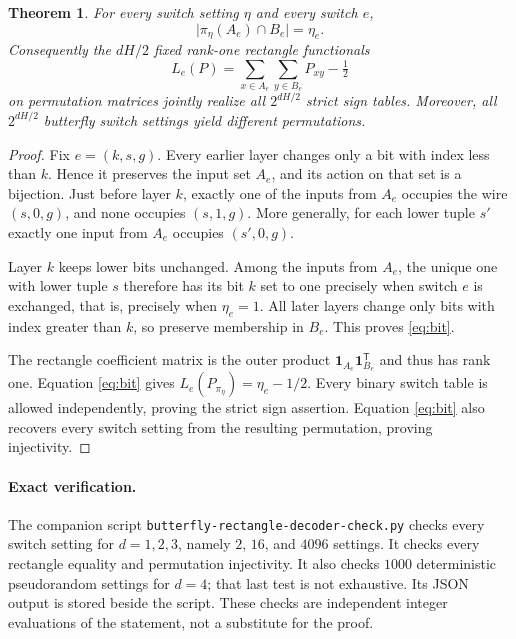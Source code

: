 \documentclass[11pt]{article}
\newtheorem{theorem}{Theorem}
\begin{document}
\begin{theorem}\label{thm:decoder}
For every switch setting $\eta$ and every switch $e$,
\[
 \bigl|\pi_\eta(A_e)\cap B_e\bigr|=\eta_e.
 \tag{1}\label{eq:bit}
\]
Consequently the $dH/2$ fixed rank-one rectangle functionals
\[
 L_e(P)=\sum_{x\in A_e}\sum_{y\in B_e}P_{xy}-\tfrac12
\]
on permutation matrices jointly realize all $2^{dH/2}$ strict sign
tables. Moreover, all $2^{dH/2}$ butterfly switch settings yield
different permutations.
\end{theorem}
\begin{proof}
Fix $e=(k,s,g)$. Every earlier layer changes only a bit with index
less than $k$. Hence it preserves the input set $A_e$, and its action
on that set is a bijection. Just before layer $k$, exactly one of the
inputs from $A_e$ occupies the wire $(s,0,g)$, and none occupies
$(s,1,g)$. More generally, for each lower tuple $s'$ exactly one
input from $A_e$ occupies $(s',0,g)$.

Layer $k$ keeps lower bits unchanged. Among the inputs from $A_e$,
the unique one with lower tuple $s$ therefore has its bit $k$ set
to one precisely when switch $e$ is exchanged, that is, precisely
when $\eta_e=1$. All later layers change only bits with index greater
than $k$, so preserve membership in $B_e$. This proves
\eqref{eq:bit}.

The rectangle coefficient matrix is the outer product
$\mathbf1_{A_e}\mathbf1_{B_e}^{\mathsf T}$ and thus has rank one.
Equation \eqref{eq:bit} gives $L_e(P_{\pi_\eta})=\eta_e-1/2$.
Every binary switch table is allowed independently, proving the
strict sign assertion. Equation \eqref{eq:bit} also recovers every
switch setting from the resulting permutation, proving injectivity.
\end{proof}

\paragraph{Exact verification.}
The companion script \texttt{butterfly-rectangle-decoder-check.py}
checks every switch setting for $d=1,2,3$, namely $2$, $16$, and
$4096$ settings. It checks every rectangle equality and permutation
injectivity. It also checks $1000$ deterministic pseudorandom
settings for $d=4$; that last test is not exhaustive. Its JSON
output is stored beside the script. These checks are independent
integer evaluations of the statement, not a substitute for the proof.
\end{document}
